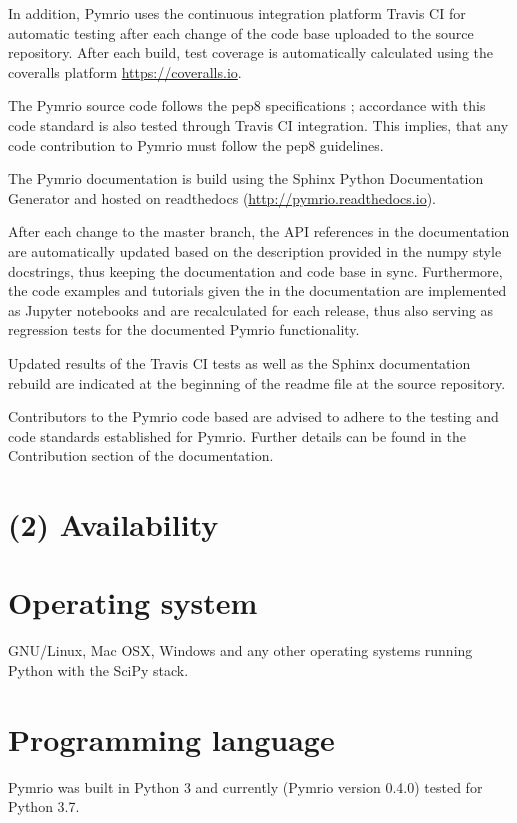 \documentclass{jors}
\begin{document}
In addition, Pymrio uses the continuous integration platform Travis CI for automatic testing after each change of the code base uploaded to the source repository. After each build, test coverage is automatically calculated using the coveralls platform \url{https://coveralls.io}.

The Pymrio source code follows the pep8 specifications ; accordance with this code standard is also tested through Travis CI integration. This implies, that any code contribution to Pymrio must follow the pep8 guidelines.

The Pymrio documentation is build using the Sphinx Python Documentation Generator and hosted on readthedocs (\url{http://pymrio.readthedocs.io}).

After each change to the master branch, the API references in the documentation are automatically updated based on the description provided in the numpy style docstrings, thus keeping the documentation and code base in sync.
Furthermore, the code examples and tutorials given the in the documentation are implemented as Jupyter notebooks and are recalculated for each release, thus also serving as regression tests for the documented Pymrio functionality.

Updated results of the Travis CI tests as well as the Sphinx documentation rebuild are indicated at the beginning of the readme file at the source repository. 

Contributors to the Pymrio code based are advised to adhere to the testing and code standards established for Pymrio. Further details can be found in the Contribution section of the documentation. 

\section*{(2) Availability}
\vspace{0.5cm}
\section*{Operating system}

GNU/Linux, Mac OSX, Windows and any other operating systems running Python with the SciPy stack.

\section*{Programming language}

Pymrio was built in Python 3 and currently (Pymrio version 0.4.0) tested for Python 3.7.
\end{document}
